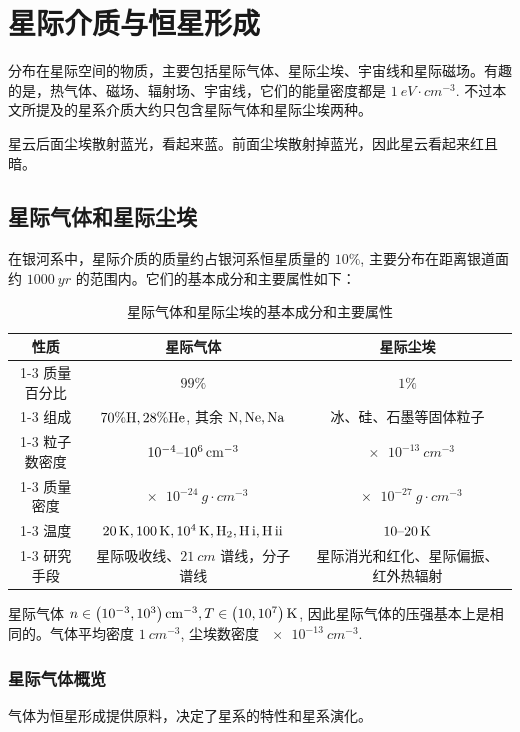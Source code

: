 \documentclass[../天体物理基础.tex]{subfiles}
\begin{document}
\section{星际介质与恒星形成}
分布在星际空间的物质，主要包括星际气体、星际尘埃、宇宙线和星际磁场。有趣的是，热气体、磁场、辐射场、宇宙线，它们的能量密度都是 $\qty{1}{eV\cdot cm^{-3}}$. 不过本文所提及的星系介质大约只包含星际气体和星际尘埃两种。

星云后面尘埃散射蓝光，看起来蓝。前面尘埃散射掉蓝光，因此星云看起来红且暗。

\subsection{星际气体和星际尘埃}
在银河系中，星际介质的质量约占银河系恒星质量的 $10\%$, 主要分布在距离银道面约 $\qty{1000}{yr}$ 的范围内。它们的基本成分和主要属性如下：
\begin{table}[!htbp]
\centering
\caption{星际气体和星际尘埃的基本成分和主要属性}
\begin{tabular}{c c c}
\hline
性质 & 星际气体 & 星际尘埃\\
\cline{1-3}
质量百分比 & $99\%$ & $1\%$\\
\cline{1-3}
组成 & $70\%\ce{H}, 28\%\ce{He}$, 其余 $\ce{N, Ne, Na}$ & 冰、硅、石墨等固体粒子\\
\cline{1-3}
粒子数密度 & $10^{-4}\text{\textendash}\qty{e6}{cm^{-3}}$ & $\qty{e-13}{cm^{-3}}$\\
\cline{1-3}
质量密度 & $\qty{e-24}{g\cdot cm^{-3}}$ & $\qty{e-27}{g\cdot cm^{-3}}$\\
\cline{1-3}
温度 & $\qty{20}{K},\qty{100}{K},\qty{e4}{K},\ce{H2},\ce{H}\,\mathrm{\uppercase\expandafter{\romannumeral1}},\ce{H}\,\mathrm{\uppercase\expandafter{\romannumeral2}}$ & $10\text{\textendash}\qty{20}{K}$\\
\cline{1-3}
研究手段 & 星际吸收线、$\qty{21}{cm}$ 谱线，分子谱线 & 星际消光和红化、星际偏振、红外热辐射\\
\hline
\end{tabular}
\label{星际气体和星际尘埃的基本成分和主要属性。}
\end{table}

星际气体 $n\in\mleft(10^{-3}, 10^{3}\mright)\,\unit{cm^{-3}}, T\in\mleft(10, 10^{7}\mright)\,\unit{K}$, 因此星际气体的压强基本上是相同的。气体平均密度 $\qty{1}{cm^{-3}}$, 尘埃数密度 $\qty{e-13}{cm^{-3}}$.

\subsubsection{星际气体概览}
气体为恒星形成提供原料，决定了星系的特性和星系演化。
\end{document}
